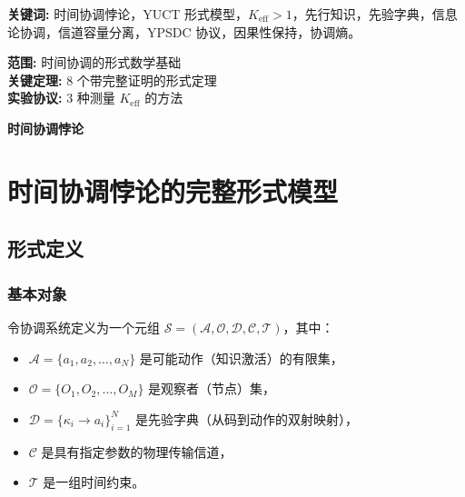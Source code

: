 \documentclass[12pt]{article}
\begin{document}
\begin{titlepage}
\begin{center}
			\vspace{0.5cm}
			\normalsize
			\textbf{关键词:} 时间协调悖论，YUCT 形式模型，$K_{\text{eff}} > 1$，先行知识，先验字典，信息论协调，信道容量分离，YPSDC 协议，因果性保持，协调熵。
			
			\vspace{0cm}
			\normalsize
			
			\textbf{范围:} 时间协调的形式数学基础 \\
			\textbf{关键定理:} 8 个带完整证明的形式定理 \\
			\textbf{实验协议:} 3 种测量 $K_{\text{eff}}$ 的方法 \\
			
			\vspace{0.5cm}
			\normalsize
			
		\end{center}
	\end{titlepage}	
	\begin{center}
		\vspace*{0.5cm}
		\Huge\textbf{时间协调悖论}
		\vspace{1cm}
	\end{center}
	
	\section{时间协调悖论的完整形式模型}
	\label{app:formal-model}
	
	\subsection{形式定义}
	\label{app:definitions}
	
	\subsubsection{基本对象}
	
	令协调系统定义为一个元组 $\mathcal{S} = (\mathcal{A}, \mathcal{O}, \mathcal{D}, \mathcal{C}, \mathcal{T})$，其中：
	
	\begin{itemize}
		\item $\mathcal{A} = \{a_1, a_2, \dots, a_N\}$ 是可能动作（知识激活）的有限集，
		\item $\mathcal{O} = \{O_1, O_2, \dots, O_M\}$ 是观察者（节点）集，
		\item $\mathcal{D} = \{\kappa_i \to a_i\}_{i=1}^N$ 是先验字典（从码到动作的双射映射），
		\item $\mathcal{C}$ 是具有指定参数的物理传输信道，
		\item $\mathcal{T}$ 是一组时间约束。
	\end{itemize}
	
\end{document}

